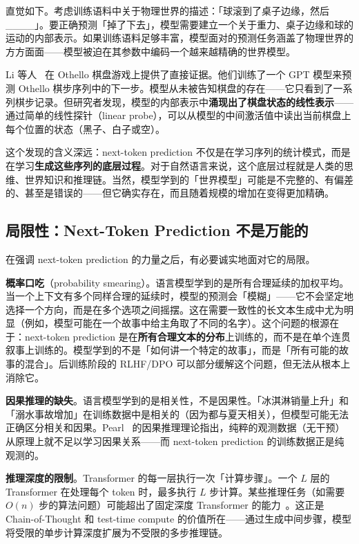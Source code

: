 直觉如下。考虑训练语料中关于物理世界的描述：「球滚到了桌子边缘，然后\_\_\_\_」。要正确预测「掉了下去」，模型需要建立一个关于重力、桌子边缘和球的运动的内部表示。如果训练语料足够丰富，模型面对的预测任务涵盖了物理世界的方方面面——模型被迫在其参数中编码一个越来越精确的世界模型。

Li 等人~\cite{li2023othello} 在 Othello 棋盘游戏上提供了直接证据。他们训练了一个 GPT 模型来预测 Othello 棋步序列中的下一步。模型从未被告知棋盘的存在——它只看到了一系列棋步记录。但研究者发现，模型的内部表示中\textbf{涌现出了棋盘状态的线性表示}——通过简单的线性探针（linear probe），可以从模型的中间激活值中读出当前棋盘上每个位置的状态（黑子、白子或空）。

这个发现的含义深远：next-token prediction 不仅是在学习序列的统计模式，而是在学习\textbf{生成这些序列的底层过程}。对于自然语言来说，这个底层过程就是人类的思维、世界知识和推理链。当然，模型学到的「世界模型」可能是不完整的、有偏差的、甚至是错误的——但它确实存在，而且随着规模的增加在变得更加精确。

\subsection{局限性：Next-Token Prediction 不是万能的}

在强调 next-token prediction 的力量之后，有必要诚实地面对它的局限。

\textbf{概率口吃}（probability smearing）。语言模型学到的是所有合理延续的加权平均。当一个上下文有多个同样合理的延续时，模型的预测会「模糊」——它不会坚定地选择一个方向，而是在多个选项之间摇摆。这在需要一致性的长文本生成中尤为明显（例如，模型可能在一个故事中给主角取了不同的名字）。这个问题的根源在于：next-token prediction 是在\textbf{所有合理文本的分布}上训练的，而不是在单个连贯叙事上训练的。模型学到的不是「如何讲一个特定的故事」，而是「所有可能的故事的混合」。后训练阶段的 RLHF/DPO 可以部分缓解这个问题，但无法从根本上消除它。

\textbf{因果推理的缺失}。语言模型学到的是相关性，不是因果性。「冰淇淋销量上升」和「溺水事故增加」在训练数据中是相关的（因为都与夏天相关），但模型可能无法正确区分相关和因果。Pearl~\cite{pearl2009causality} 的因果推理理论指出，纯粹的观测数据（无干预）从原理上就不足以学习因果关系——而 next-token prediction 的训练数据正是纯观测的。

\textbf{推理深度的限制}。Transformer 的每一层执行一次「计算步骤」。一个 $L$ 层的 Transformer 在处理每个 token 时，最多执行 $L$ 步计算。某些推理任务（如需要 $O(n)$ 步的算法问题）可能超出了固定深度 Transformer 的能力~\cite{merrill2023expressive}。这正是 Chain-of-Thought 和 test-time compute 的价值所在——通过生成中间步骤，模型将受限的单步计算深度扩展为不受限的多步推理链。

